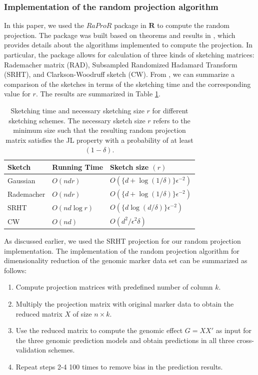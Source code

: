 \subsubsection{Implementation of the random projection algorithm}

In this paper, we used the $RaProR$ package \cite{RaProR} in $\textbf{R}$ \cite{Rcite} to compute the random projection. The package was built based on theorems and results in \cite{geppert_random_2017}, which provides details about the algorithms implemented to compute the projection. In particular, the package allows for calculation of three kinds of sketching matrices: Rademacher matrix (RAD), Subsampled Randomized Hadamard Transform (SRHT), and Clarkson-Woodruff sketch (CW). From \cite{woodruff_sketching_2014, geppert_random_2017, ahfock_statistical_2019}, we can summarize a comparison of the sketches in terms of the sketching time and the corresponding value for $r$. The results are summarized in Table \ref{tab:sketch}. \\

\begin{table}[h]
\centering
\begin{tabular}{lll}
\hline
\textbf{Sketch}     & \textbf{Running Time}   & \textbf{Sketch size $(r)$}           \\
\hline
Gaussian   & $O(ndr)$       & $O(\{d+\log(1/\delta) \} \epsilon^{-2})$ \\
Rademacher & $O(ndr)$       & $O(\{d+\log(1/\delta) \} \epsilon^{-2})$ \\
SRHT       & $O(nd \log r)$ & $O(\{d \log (d/\delta)\}\epsilon^{-2})$  \\
CW         & $O(nd)$        & $O(d^2/\epsilon^2\delta )$              \\
\hline
\end{tabular}
\caption{Sketching time and necessary sketching size $r$ for different sketching schemes. The necessary sketch size $r$ refers to the minimum size such that the resulting random projection matrix satisfies the JL property with a probability of at least $(1-\delta)$.}
\label{tab:sketch}
\end{table}

As discussed earlier, we used the SRHT projection for our random projection implementation. The implementation of the random projection algorithm for dimensionality reduction of the genomic marker data set can be summarized as follows:

\begin{enumerate}
    \item Compute projection matrices with predefined  number of column $k$.
    \item Multiply the projection matrix with original marker data to obtain the reduced matrix $X$ of size $n \times k$.
    \item Use the reduced matrix to compute the genomic effect $G = XX'$ as input for the three genomic prediction models and obtain predictions in all three cross-validation schemes.
    \item Repeat steps 2-4 100 times to remove bias in the prediction results.
\end{enumerate}

